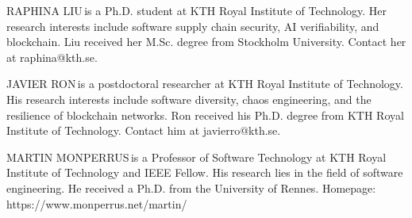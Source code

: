 \documentclass{IEEEcsmag}
\begin{document}
\begin{IEEEbiography}{RAPHINA LIU}{\,}is a Ph.D. student at KTH Royal Institute of Technology. Her research interests include software supply chain security, AI verifiability, and blockchain. Liu received her M.Sc. degree from Stockholm University. Contact her at raphina@kth.se.
\end{IEEEbiography}

\begin{IEEEbiography}{JAVIER RON}{\,}is a postdoctoral researcher at KTH Royal Institute of Technology. His research interests include software diversity, chaos engineering, and the resilience of blockchain networks. Ron received his Ph.D. degree from KTH Royal Institute of Technology. Contact him at javierro@kth.se.
\end{IEEEbiography}

\begin{IEEEbiography}{MARTIN MONPERRUS}{\,}is a Professor of Software Technology at KTH Royal Institute of Technology and IEEE Fellow. His research lies in the field of software engineering. He received a Ph.D. from the University of Rennes.  Homepage: https://www.monperrus.net/martin/
\end{IEEEbiography}
\end{document}
